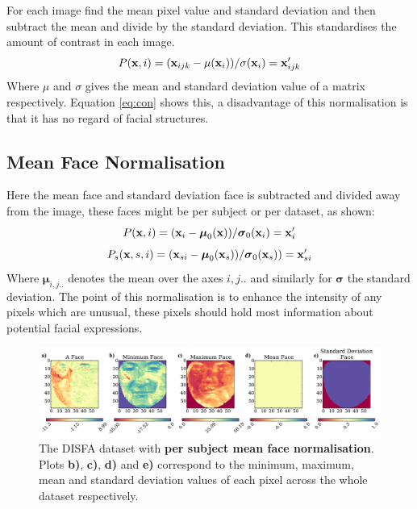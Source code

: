       For each image find the mean pixel value and standard deviation and then subtract the mean
      and divide by the standard deviation. This standardises the amount of contrast in each image.
      \begin{equation}
         P({\bf x},i)= ({\bf x}_{ijk} - \mu({\bf x}_{i}))/\sigma ({\bf x}_{i}) = {\bf x}_{ijk}'
         \label{eq:con}
      \end{equation}
      Where $\mu$ and $\sigma$ gives the mean and standard deviation value of a matrix respectively.
      Equation \ref{eq:con} shows this, a disadvantage of this normalisation is that it
      has no regard of facial structures.

    \subsection{Mean Face Normalisation} \label{sec:meanface}
      Here the mean face and standard deviation face is subtracted and divided away from the
      image, these faces might be per subject or per dataset, as shown:
      \begin{equation}
        P({\bf x},i) =  ({\bf x}_{i} - {\boldsymbol \mu}_0( {\bf x}))/{\boldsymbol \sigma}_0({\bf x}_{i})  = {\bf x}_{i}'
      \end{equation}
      \begin{equation}
        P_s({\bf x},s,i) = ({\bf x}_{si} - {\boldsymbol \mu}_{0}( {\bf x}_s))/{\boldsymbol \sigma}_{0}( {\bf x}_s))  = {\bf x}_{si}'
      \end{equation}
      Where ${\boldsymbol \mu}_{i,j..}$ denotes the mean over the axes $i,j..$ and
      similarly for ${\boldsymbol \sigma} $ the standard deviation.
      The point of this normalisation is to enhance the intensity of any pixels which
      are unusual, these pixels should hold most information about potential facial expressions.
      \begin{figure}[!h] \centering
      \includegraphics[width =\hsize]{figures/faces_per_subject_face.pdf}
      \caption{The DISFA dataset with {\bf per subject mean face normalisation}.
      Plots {\bf b)}, {\bf c)}, {\bf d)} and {\bf e)} correspond to the minimum,
      maximum, mean and standard deviation values of each pixel across the whole
      dataset respectively.}
      \label{fig:}
      \end{figure}

